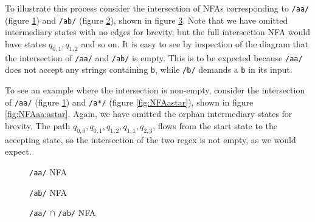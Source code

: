 To illustrate this process consider the intersection of NFAs corresponding
to \verb'/aa/' (figure \ref{fig:NFAaa}) and \verb'/ab/'
(figure \ref{fig:NFAab}), shown in figure \ref{fig:NFAaa:ab}. Note that
we have omitted intermediary states with no edges for brevity, but the
full intersection NFA would have states $q_{0,1}, q_{1,2}$ and so on.
It is easy to see by inspection of the diagram that the intersection of
\verb'/aa/' and \verb'/ab/' is empty. This is to be expected because
\verb'/aa/' does not accept any strings containing \verb'b', while
\verb'/b/' demands a \verb'b' in its input.

To see an example where the intersection is non-empty, consider the
intersection of \verb'/aa/' (figure \ref{fig:NFAaa}) and \verb'/a*/'
(figure \ref{fig:NFAastar}), shown in figure \ref{fig:NFAaa:astar}.
Again, we have omitted the orphan intermediary states for brevity.
The path $q_{0,0}, q_{0,1}, q_{1,2}, q_{1,1}, q_{2,3}$, flows from
the start state to the accepting state, so the intersection of the
two regex is not empty, as we would expect.

\begin{figure}
\centering
\caption{{\tt /aa/} NFA}
\label{fig:NFAaa}
\end{figure}

\begin{figure}
\centering
\caption{{\tt /ab/} NFA}
\label{fig:NFAab}
\end{figure}

\begin{figure}
\centering
\caption{{\tt /aa/} $\cap$ {\tt /ab/} NFA}
\label{fig:NFAaa:ab}
\end{figure}

